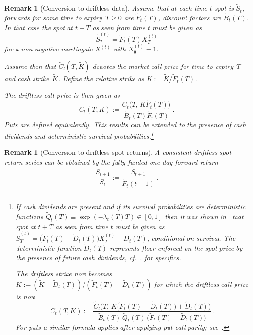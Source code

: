 \documentclass[11pt,a4paper]{article}
\newtheorem{remark}[definition]{Remark}
\DeclareRobustCommand{\eqlabel}[1]{\label{eq:#1}}                                     %
\DeclareRobustCommand{\eq}[1]{\begin{equation}\eqlabel{#1}}                           %
\DeclareRobustCommand{\eqend}{\end{equation}}                                         %
\begin{document}
\begin{remark}[Conversion to driftless data]\label{rem:driftless}
  Assume that at each time $t$ spot is $\tilde S_t$, forwards for some time to expiry~$T\geq 0$ are $\tilde F_t(T)$, discount factors are $\tilde B_t(T)$.
  In  that case the spot at $t+T$ as seen from time $t$ must be given as
  $$
  \tilde S_T^{(t)}= \tilde F_t(T)X_T^{(t)}
  $$
  for a non-negative martingale $X^{(t)}$ with $X^{(t)}_0=1$.

  Assume then that $\tilde C_t( T,\tilde{K})$ denotes the market call price for time-to-expiry~$T$ and cash strike~$\tilde K$.
  Define the relative strike as
  $
  K :=\tilde K / \tilde F_t(  T)
  $.

  The driftless call price is then given as
  $$
    C_t( T,K) := \frac{\tilde{C}_t\Big( T,\, K \tilde F_t(T) \Big)}{\tilde B_t(T) \tilde F_t(T) } \ .
  $$
  Puts are defined equivalently.
  This results can  be extended to the presence of cash dividends and deterministic survival probabilities.\footnote{
    If cash dividends
    are present and if its survival probabilities are deterministic functions $\tilde Q_t(T)\equiv \exp( - \lambda_t(T)T )\in [0,1]$ then it was shown in~\citet{BuehlerVolAndDivs}
    that spot at $t+T$ as seen from time $t$ must be given as $\tilde S_T^{(t)}=\big(\tilde F_t(T)-\tilde D_t(T)\big) X_T^{(t)} + \tilde D_t(T)$, conditional on survival.
    The deterministic function $\tilde D_t(T)$ represents floor enforced on the spot price by the presence of future cash dividends, cf.~\citet{BuehlerVolAndDivs}.
    for specifics.

    The driftless strike now becomes
    $
    K := (\tilde K - \tilde D_t( T) ) / ( \tilde F_t(  T) - \tilde D_t(T) )
    $
    for which the driftless call price is now
    $$
      C_t( T,K) := \frac{\tilde{C}_t\Big( T,\, K\big(\tilde F_t(T)-\tilde D_t(T)\big) + \tilde D_t(T)\Big)}{\tilde B_t(T) \, \tilde Q_t(T)\,\big(\tilde F_t(T)-\tilde D_t(T)\big)} \ .
    $$
    For puts a similar formula applies after applying put-call parity; see~\citet{BuehlerVolAndDivs}.}
\end{remark}

\begin{remark}[Conversion to driftless spot returns]\label{rem:driftlessspot}
  A consistent driftless spot return series can be obtained by the fully funded one-day forward-return
  \eq{driftlessspotret}
    \frac{ S_{t+1} }{ S_t } := \frac{\tilde S_{t+1}}{\tilde F_t(t+1)}  \ .
  \eqend
\end{remark}
\end{document}
